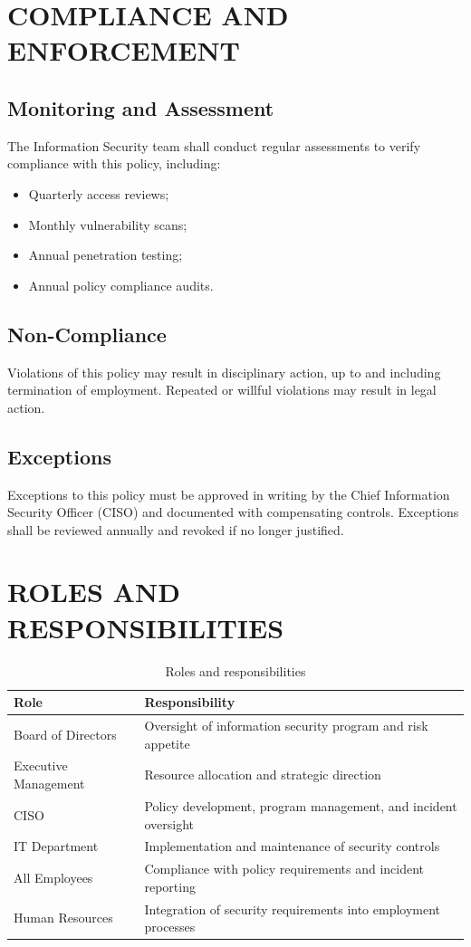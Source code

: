 \documentclass[
    language=english,
    doctype=policy-document,
    institution=none,
]{../../omnilatex}
\begin{document}
\section{COMPLIANCE AND ENFORCEMENT}

\subsection{Monitoring and Assessment}
The Information Security team shall conduct regular assessments to verify compliance with this policy, including:
\begin{itemize}
    \item Quarterly access reviews;
    \item Monthly vulnerability scans;
    \item Annual penetration testing;
    \item Annual policy compliance audits.
\end{itemize}

\subsection{Non-Compliance}
Violations of this policy may result in disciplinary action, up to and including termination of employment. Repeated or willful violations may result in legal action.

\subsection{Exceptions}
Exceptions to this policy must be approved in writing by the Chief Information Security Officer (CISO) and documented with compensating controls. Exceptions shall be reviewed annually and revoked if no longer justified.

\section{ROLES AND RESPONSIBILITIES}

\begin{table}[h]
\centering
\small
\begin{tabular}{p{4cm}p{9cm}}
\toprule
\textbf{Role} & \textbf{Responsibility} \\
\midrule
Board of Directors & Oversight of information security program and risk appetite \\
Executive Management & Resource allocation and strategic direction \\
CISO & Policy development, program management, and incident oversight \\
IT Department & Implementation and maintenance of security controls \\
All Employees & Compliance with policy requirements and incident reporting \\
Human Resources & Integration of security requirements into employment processes \\
\bottomrule
\end{tabular}
\caption{Roles and responsibilities}
\end{table}
\end{document}
